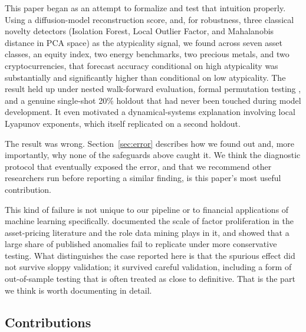 \documentclass[preprint,12pt]{elsarticle}
\begin{document}
This paper began as an attempt to formalize and test that intuition properly. Using a
diffusion-model reconstruction score, and, for robustness, three classical novelty detectors
(Isolation Forest, Local Outlier Factor, and Mahalanobis distance in PCA space) as the
atypicality signal, we found across seven asset classes, an equity index, two energy
benchmarks, two precious metals, and two cryptocurrencies, that forecast accuracy conditional
on high atypicality was substantially and significantly higher than conditional on low
atypicality. The result held up under nested walk-forward evaluation, formal permutation
testing \citep{good2005}, and a genuine single-shot 20\% holdout that had never been touched
during model development. It even motivated a
dynamical-systems explanation involving local Lyapunov exponents, which itself replicated on a
second holdout.

The result was wrong. Section~\ref{sec:error} describes how we found out and, more
importantly, why none of the safeguards above caught it. We think the diagnostic protocol that
eventually exposed the error, and that we recommend other researchers run before reporting a
similar finding, is this paper's most useful contribution.

This kind of failure is not unique to our pipeline or to financial applications of machine
learning specifically. \citet{harvey2016} documented the scale of factor proliferation in the
asset-pricing literature and the role data mining plays in it, and \citet{hou2020} showed that
a large share of published anomalies fail to replicate under more conservative testing. What
distinguishes the case reported here is that the spurious effect
did not survive sloppy validation; it survived careful validation, including a form of
out-of-sample testing that is often treated as close to definitive. That is the part we think
is worth documenting in detail.

\subsection{Contributions}
\end{document}
